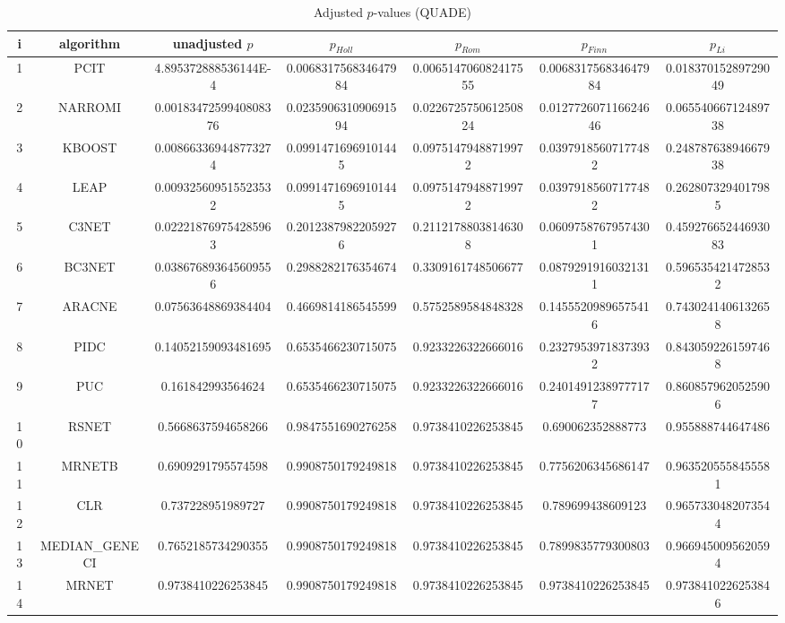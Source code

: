 \documentclass[a4paper,10pt]{article}
\begin{document}
\begin{landscape}
\begin{table}[!htp]
\centering\scriptsize
\caption{Adjusted $p$-values (QUADE)}
\begin{tabular}{ccccccc}
i&algorithm&unadjusted $p$&$p_{Holl}$&$p_{Rom}$&$p_{Finn}$&$p_{Li}$\\
\hline
1&PCIT&4.895372888536144E-4&0.006831756834647984&0.006514706082417555&0.006831756834647984&0.01837015289729049\\
2&NARROMI&0.0018347259940808376&0.023590631090691594&0.022672575061250824&0.012772607116624646&0.06554066712489738\\
3&KBOOST&0.008663369448773274&0.09914716969101445&0.09751479488719972&0.03979185607177482&0.24878763894667938\\
4&LEAP&0.009325609515523532&0.09914716969101445&0.09751479488719972&0.03979185607177482&0.2628073294017985\\
5&C3NET&0.022218769754285963&0.20123879822059276&0.21121788038146308&0.06097587679574301&0.45927665244693083\\
6&BC3NET&0.038676893645609556&0.2988282176354674&0.3309161748506677&0.08792919160321311&0.5965354214728532\\
7&ARACNE&0.07563648869384404&0.4669814186545599&0.5752589584848328&0.14555209896575416&0.7430241406132658\\
8&PIDC&0.14052159093481695&0.6535466230715075&0.9233226322666016&0.23279539718373932&0.8430592261597468\\
9&PUC&0.161842993564624&0.6535466230715075&0.9233226322666016&0.24014912389777177&0.8608579620525906\\
10&RSNET&0.5668637594658266&0.9847551690276258&0.9738410226253845&0.690062352888773&0.955888744647486\\
11&MRNETB&0.6909291795574598&0.9908750179249818&0.9738410226253845&0.7756206345686147&0.9635205558455581\\
12&CLR&0.737228951989727&0.9908750179249818&0.9738410226253845&0.789699438609123&0.9657330482073544\\
13&MEDIAN_GENECI&0.7652185734290355&0.9908750179249818&0.9738410226253845&0.7899835779300803&0.9669450095620594\\
14&MRNET&0.9738410226253845&0.9908750179249818&0.9738410226253845&0.9738410226253845&0.9738410226253846\\
\hline
\end{tabular}
\end{table}

\end{landscape}
\end{document}
